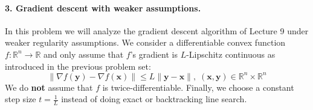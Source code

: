 \documentclass[11pt]{article}
\theoremstyle{remark}
\newcommand{\R}{\mathbb{R}}                     %
\newcommand{\bx}{\mathbf{x}}
\newcommand{\by}{\mathbf{y}}
\begin{document}
\paragraph{3. Gradient descent with weaker assumptions.}

In this problem we will analyze the gradient descent algorithm of Lecture
9 under weaker regularity assumptions. We consider a differentiable convex
  function $f:\R^n\to\R$ and only assume that $f$'s gradient is
  $L$-Lipschitz continuous as introduced in the previous problem set:
  \begin{displaymath}
      \|\nabla f(\by) - \nabla f(\bx)\| \leq L\|\by-\bx\|,\;
      (\bx,\by)\in\R^n\times\R^n
\end{displaymath}
We do \textbf{not} assume that $f$ is twice-differentiable. Finally, we
choose a constant step size $t=\frac{1}{L}$ instead of doing exact or
backtracking line search.
\end{document}
